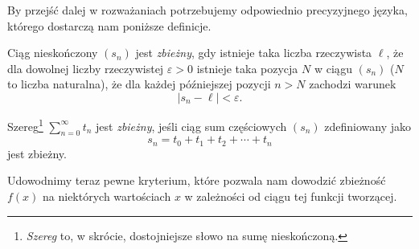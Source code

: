 \documentclass[shortabstract]{imthesis}
\begin{document}
By przejść dalej w rozważaniach potrzebujemy odpowiednio precyzyjnego języka, którego dostarczą nam poniższe definicje.

\begin{definition}
    Ciąg nieskończony $(s_n)$ jest \emph{zbieżny}, gdy istnieje taka liczba rzeczywista $\ell$, że dla dowolnej liczby rzeczywistej $\varepsilon > 0$ istnieje taka pozycja $N$ w ciągu $(s_n)$ ($N$ to liczba naturalna), że dla każdej późniejszej pozycji $n > N$ zachodzi warunek
    $$
    |s_n - \ell| < \varepsilon.
    $$
\end{definition}

\begin{definition}
    Szereg\footnote{\emph{Szereg} to, w skrócie, dostojniejsze słowo na sumę nieskończoną.} $\sum_{n=0}^\infty t_n$ jest \emph{zbieżny}, jeśli ciąg sum częściowych $(s_n)$ zdefiniowany jako
    $$
    s_n = t_0 + t_1 + t_2 + \cdots + t_n
    $$
    jest zbieżny.
\end{definition}

Udowodnimy teraz pewne kryterium, które pozwala nam dowodzić zbieżność $f(x)$ na niektórych wartościach $x$ w zależności od ciągu tej funkcji tworzącej.
\end{document}
